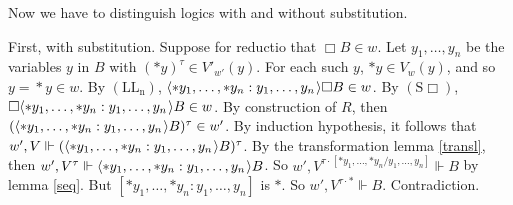 \documentclass[11pt]{woarticle}
\newcommand{\cmnt}[1]{\iffalse #1 \fi}
\theoremstyle{break}
\theoremstyle{nonumberplain}
\newcommand{\SAT}{\Vdash}
\newcommand{\1}{\;\,|\;\,}
\renewcommand{\t}[1]{\ensuremath{\langle #1  \makebox[.2ex]{}\rangle}}
\newcommand{\T}[1]{\ensuremath{(\mathrm{ #1})}}
\begin{document}
{  Now we have to distinguish logics with and without substitution.

  First, with substitution.  Suppose for reductio that $\Box B \in
  w$. Let $y_1,\ldots,y_n$ be the variables $y$ in $B$ with $(*y)^\tau
  \in V'_{w'}(y)$. \cmnt{(Note that this excludes all empty variables,
    as well as variables denoting things without counterparts.)} For
  each such $y$, $*y \in V_w(y)$, and so $y\!=\!*y \in w$. By
  \T{LL_n}, $\t{*y_1,\ldots,*y_n : y_1,\ldots, y_n}\Box B \in w$. By
  \T{S\Box}, $\Box\t{*y_1,\ldots,*y_n : y_1,\ldots, y_n} B \in w$. By
  construction of $R$, then $(\t{*y_1,\ldots,*y_n : y_1,\ldots, y_n}
  B)^\tau \in w'$. By induction hypothesis, it follows that $w', V
  \SAT (\t{*y_1,\ldots,*y_n : y_1,\ldots, y_n} B)^\tau$. By the
  transformation lemma \ref{transl}, then $w', V^\tau \SAT
  \t{*y_1,\ldots,*y_n : y_1,\ldots, y_n} B$. So $w', V^{\tau \cdot
    [*y_1,\ldots,*y_n / y_1,\ldots, y_n]} \SAT B$ by lemma
  \ref{seq}. But $[*y_1,\ldots,*y_n : y_1,\ldots, y_n]$ is
  $*$. \cmnt{(If $(*y)^\tau \not\in V'_{w'}(y)$, then $V'_{w'}(y)$ is
    undefined, and there is no $z \in V_w(y)$ with $z^\tau \in
    V'_{w'}(y)$, so then $*y = y$.)} So $w',V^{\tau\cdot *} \SAT
  B$. Contradiction.

}
\end{document}
